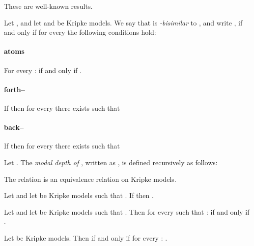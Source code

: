 \documentclass[twoside]{aiml14}
\begin{document}
  These are well-known results.

  \begin{definition}
      Let , 
      and let  
      and  be Kripke models.
      We say that  is {\em -bisimilar} 
      to ,
      and write ,
      if and only if for every  the following conditions hold:

      \paragraph{atoms}
      For every :  if and only if .

      \paragraph{forth--}
      If  then
      for every  
      there exists 
      such that  

      \paragraph{back--}
      If  then
      for every 
      there exists  
      such that  
  \end{definition}

  \begin{definition}
      Let . The {\em modal depth of }, written as , is defined recursively as follows:
      
  \end{definition}

  \begin{proposition}
      The relation  is an equivalence relation on Kripke models.
  \end{proposition}

  \begin{proposition}
      Let  and 
      let  be Kripke models 
      such that . 
      If  then . 
  \end{proposition}

  \begin{proposition}
      Let  and 
      let  be Kripke models such that
      . 
      Then for every  such that :
       if and only if .
  \end{proposition}

  \begin{proposition}
      Let  be Kripke models.
      Then 
      if and only if for every : 
      .
  \end{proposition}
  
\end{document}
